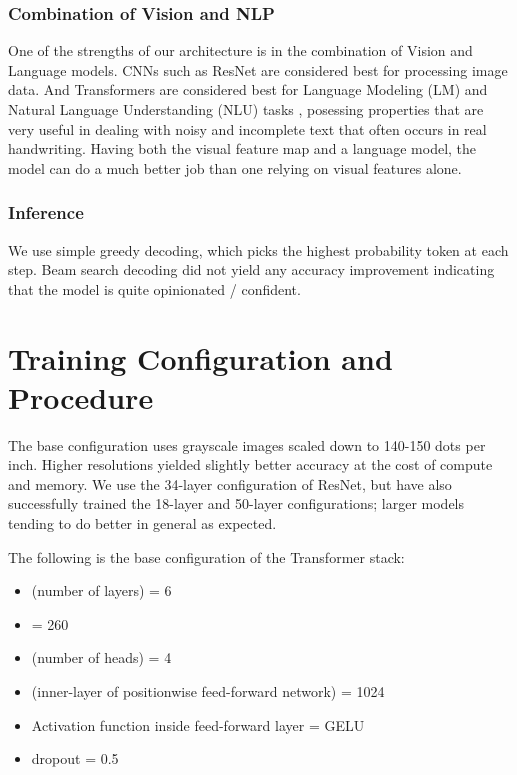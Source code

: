 \documentclass[runningheads]{llncs}
\begin{document}
\subsubsection{Combination of Vision and NLP}
One of the strengths of our architecture is in the combination of Vision and Language models.
{\small CNN}s such as ResNet are considered best for processing image data.
And Transformers are considered best for Language Modeling ({\small LM}) and Natural Language Understanding ({\small NLU}) tasks \citep{raffel2020exploring,Radford2018ImprovingLU,devlin2019bert}, posessing properties that are very useful in dealing with noisy and incomplete text that often occurs in real handwriting.
Having both the visual feature map and a language model, the model can do a much better job than one relying on visual features alone.

\subsubsection{Inference}
We use simple greedy decoding, which picks the highest probability token at each step.
Beam search decoding \citep{Graves2008SupervisedSL} did not yield any accuracy improvement indicating that the model is quite opinionated / confident.

\section{Training Configuration and Procedure}
The base configuration uses grayscale images scaled down to 140-150 dots per inch.
Higher resolutions yielded slightly better accuracy at the cost of compute and memory.
We use the 34-layer configuration of ResNet, but have also successfully trained the 18-layer and 50-layer configurations; larger models tending to do better in general as expected.

The following is the base configuration of the Transformer stack:
\begin{itemize}
    \item  (number of layers) = 6
    \item  = 260
    \item  (number of heads) = 4
    \item  (inner-layer of positionwise feed-forward network) = 1024
    \item Activation function inside feed-forward layer = {\small GELU} \citep{DBLP:journals/corr/HendrycksG16}
    \item dropout = 0.5
\end{itemize}
\end{document}

